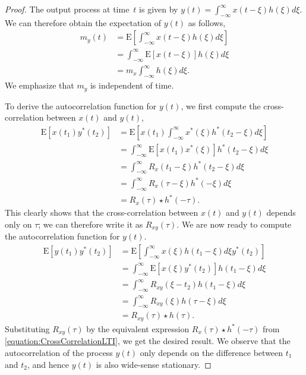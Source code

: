 \begin{proof}
The output process at time~$t$ is given by $y(t) = \int_{-\infty}^{\infty} x(t - \xi) h(\xi) d\xi$.
We can therefore obtain the expectation of $y(t)$ as follows,
\begin{equation*}
\begin{split}
m_y (t) &= \mathrm{E} \left[ \int_{-\infty}^{\infty} x(t - \xi) h(\xi) d\xi \right] \\
&= \int_{-\infty}^{\infty} \mathrm{E} \left[ x(t - \xi) \right] h(\xi) d\xi \\
&= m_x \int_{-\infty}^{\infty} h(\xi) d\xi.
\end{split}
\end{equation*}
We emphasize that $m_y$ is independent of time.

To derive the autocorrelation function for $y(t)$, we first compute the cross-correlation between $x(t)$ and $y(t)$,
\begin{equation} \label{equation:CrossCorrelationLTI}
\begin{split}
\mathrm{E} [x(t_1) y^*(t_2) ]
&= \mathrm{E} \left[ x(t_1) \int_{-\infty}^{\infty} x^*(\xi) h^*(t_2 - \xi) d\xi \right] \\
&= \int_{-\infty}^{\infty} \mathrm{E} \left[ x(t_1) x^*(\xi) \right] h^*(t_2 - \xi) d\xi \\
&= \int_{-\infty}^{\infty} R_x(t_1 - \xi) h^*(t_2 - \xi) d\xi \\
&= \int_{-\infty}^{\infty} R_x(\tau - \xi) h^*(- \xi) d\xi \\
&= R_x(\tau) \star h^*(-\tau) .
\end{split}
\end{equation}
This clearly shows that the cross-correlation between $x(t)$ and $y(t)$ depends only on $\tau$; we can therefore write it as $R_{xy}(\tau)$.
We are now ready to compute the autocorrelation function for $y(t)$.
\begin{equation} \label{equation:AutoCorrelationLTI}
\begin{split}
\mathrm{E} [y(t_1) y^*(t_2) ]
&= \mathrm{E} \left[ \int_{-\infty}^{\infty} x(\xi) h(t_1 - \xi) d\xi y^*(t_2) \right] \\
&= \int_{-\infty}^{\infty} \mathrm{E} \left[ x(\xi) y^*(t_2) \right] h(t_1 - \xi) d\xi \\
&= \int_{-\infty}^{\infty} R_{xy}(\xi - t_2) h(t_1 - \xi) d\xi \\
&= \int_{-\infty}^{\infty} R_{xy}(\xi) h(\tau - \xi) d\xi \\
&= R_{xy}(\tau) \star h(\tau) .
\end{split}
\end{equation}
Substituting $R_{xy} (\tau)$ by the equivalent expression $R_x(\tau) \star h^*(-\tau)$ from \eqref{equation:CrossCorrelationLTI}, we get the desired result.
We observe that the autocorrelation of the process $y(t)$ only depends on the difference between $t_1$ and $t_2$, and hence $y(t)$ is also wide-sense stationary.
\end{proof}

